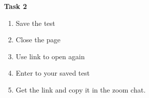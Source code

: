 \documentclass[conference]{IEEEtran}
\begin{document}
\textbf{Task 2}

\begin{enumerate}
\item Save the test
\item Close the page
\item Use link to open again
\item Enter to your saved test
\item Get the link and copy it in the zoom chat.
\end{enumerate}
\end{document}
